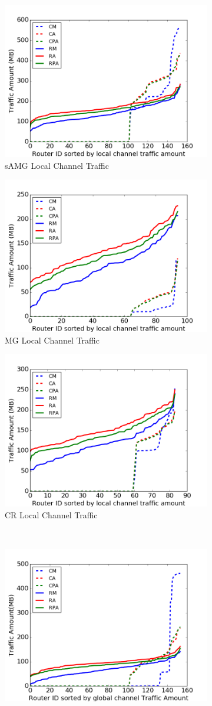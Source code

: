\documentclass[conference,compsoc]{IEEEtran}
\begin{document}
\begin{figure}[t]
    \centering
    \begin{subfigure}[t]{0.32\textwidth}
        \centering
        \includegraphics[height=1.5 in]{syn-wkld/amg10/lc-traffic}
        \caption{sAMG Local Channel Traffic}
        \label{fig:syn-samg-lc-traffic}
    \end{subfigure}\hfill
    \hspace{1em}%
    \begin{subfigure}[t]{0.32\textwidth}
        \centering
        \includegraphics[height=1.5 in]{syn-wkld/mg/lc-traffic}
        \caption{MG Local Channel Traffic}
        \label{fig:syn-mg-lc-traffic}
    \end{subfigure}\hfill
    \begin{subfigure}[t]{0.32\textwidth}
        \centering
        \includegraphics[height=1.5 in]{syn-wkld/cr/lc-traffic}
        \caption{CR Local Channel Traffic}
        \label{fig:syn-cr-lc-traffic}
    \end{subfigure}\\
    \centering
    \begin{subfigure}[t]{0.32\textwidth}
        \centering
        \includegraphics[height=1.5 in]{syn-wkld/amg10/gc-traffic}

\end{subfigure}
\end{figure}
\end{document}
